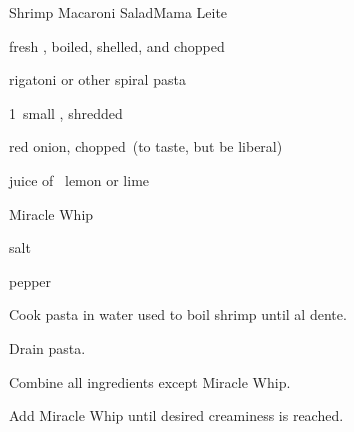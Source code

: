 \begin{recipe}{Shrimp Macaroni Salad}{Mama Leite}{}

\begin{ingredients}
\item \lbs{\half} fresh , boiled, shelled, and chopped
\item {} rigatoni or other spiral pasta
\item 1~small , shredded
\item red onion, chopped~(to taste, but be liberal)
\item juice of \half{}~lemon or lime
\item Miracle Whip
\item salt
\item pepper
\end{ingredients}

\begin{directions}
\item Cook pasta in water used to boil shrimp until al dente.
\item Drain pasta.
\item Combine all ingredients except Miracle Whip.
\item Add Miracle Whip until desired creaminess is reached.
\end{directions}

\end{recipe}
